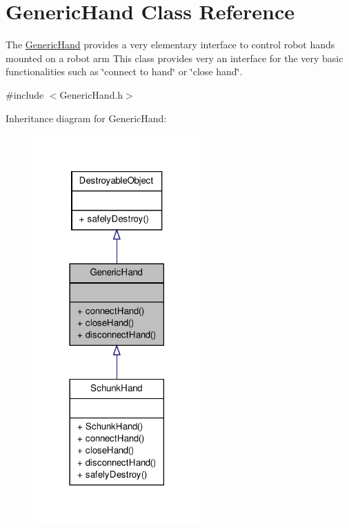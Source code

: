 \hypertarget{classGenericHand}{\section{\-Generic\-Hand \-Class \-Reference}
\label{classGenericHand}
}


\-The \hyperlink{classGenericHand}{\-Generic\-Hand} provides a very elementary interface to control robot hands mounted on a robot arm \-This class provides very an interface for the very basic functionalities such as \char`\"{}connect to hand\char`\"{} or \char`\"{}close hand\char`\"{}.  




{\ttfamily \#include $<$\-Generic\-Hand.\-h$>$}



\-Inheritance diagram for \-Generic\-Hand\-:\nopagebreak
\begin{figure}[H]
\begin{center}
\leavevmode
\includegraphics[width=182pt]{classGenericHand__inherit__graph}
\end{center}
\end{figure}


